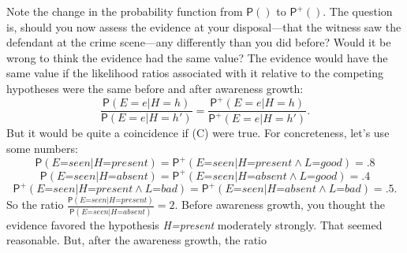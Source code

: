 \documentclass[
  11pt,
  dvipsnames,enabledeprecatedfontcommands]{scrartcl}
\newcommand{\pr}[1]{\ensuremath{\mathsf{P}(#1)}}
\newcommand{\ppr}[2]{\ensuremath{\mathsf{P}^{#1}(#2)}}
\begin{document}
Note the change in the probability function from \(\pr{}\) to
\(\ppr{+}{}\). The question is, should you now assess the evidence at
your disposal---that the witness saw the defendant at the crime
scene---any differently than you did before? Would it be wrong to think
the evidence had the same value? The evidence would have the same value
if the likelihood ratios associated with it relative to the competing
hypotheses were the same before and after awareness growth:
\[\frac{\pr{E=e \vert H=h}}{\pr{E=e \vert H=h'}}= \frac{\ppr{+}{E=e \vert H=h}}{\ppr{+}{E=e \vert H=h'}} \tag{C}.\]
But it would be quite a coincidence if (C) were true. For concreteness,
let's use some numbers:
\[\pr{\textit{E=seen} \vert \textit{H=present}}=\ppr{+}{\textit{E=seen} \vert \textit{H=present} \wedge \textit{L=good}}=.8\]
\[\pr{\textit{E=seen} \vert \textit{H=absent}}=\ppr{+}{\textit{E=seen} \vert \textit{H=absent} \wedge \textit{L=good}}=.4\]
\[\ppr{+}{\textit{E=seen} \vert \textit{H=present} \wedge \textit{L=bad}} = \ppr{+}{\textit{E=seen} \vert \textit{H=absent} \wedge \textit{L=bad}}=.5.\]
So the ratio
\(\frac{\pr{\textit{E=seen} \vert \textit{H=present}}}{\pr{\textit{E=seen} \vert \textit{H=absent}}}=2\).
Before awareness growth, you thought the evidence favored the hypothesis
\textit{H=present} moderately strongly. That seemed reasonable. But,
after the awareness growth, the ratio
\end{document}
